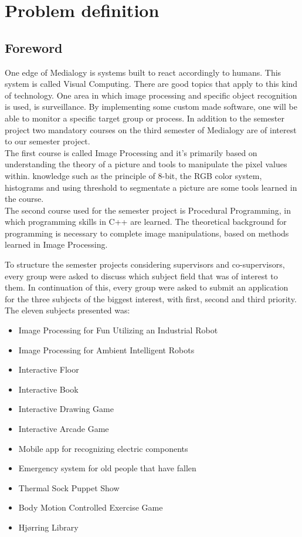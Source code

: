 \chapter{Problem definition}
\section{Foreword}
One edge of Medialogy is systems built to react accordingly to humans. This system is called Visual Computing. There are good topics that apply to this kind of technology. One area in which image processing and specific object recognition is used, is surveillance. By implementing some custom made software, one will be able to monitor a specific target group or process. In addition to the semester project two mandatory courses on the third semester of Medialogy are of interest to our semester project.\\
The first course is called Image Processing and it's primarily based on understanding the theory of a picture and tools to manipulate the pixel values within. knowledge such as the principle of 8-bit, the RGB color system, histograms and using threshold to segmentate a picture are some tools learned in the course.\\
The second course used for the semester project is Procedural Programming, in which programming skills in C++ are learned. The theoretical background for programming is necessary to complete image manipulations, based on methods learned in Image Processing.

To structure the semester projects considering supervisors and co-supervisors, every group were asked to discuss which subject field that was of interest to them. In continuation of this, every group were asked to submit an application for the three subjects of the biggest interest, with first, second and third priority.\\
The eleven subjects presented was:

\begin{itemize}
\item Image Processing for Fun Utilizing an Industrial Robot
\item Image Processing for Ambient Intelligent Robots
\item Interactive Floor
\item Interactive Book
\item Interactive Drawing Game
\item Interactive Arcade Game
\item Mobile app for recognizing electric components
\item Emergency system for old people that have fallen
\item Thermal Sock Puppet Show
\item Body Motion Controlled Exercise Game
\item Hjørring Library
\end{itemize}

